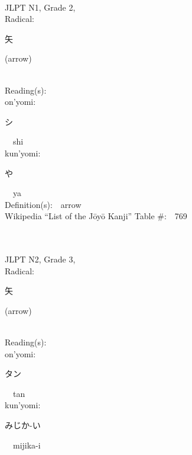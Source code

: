\begin{multicols}{2}
{\fontsize{34pt}{40pt}  }\ \ \\  %
{JLPT N1, Grade 2, \\Radical:\ \ {\begin{CJK}{UTF8}{min} 矢 \end{CJK}} (arrow) } \\
Reading(s):\ \ \\
{\hspace*{1em}}on'yomi:\ \ \\
{\hspace*{2em}}{\begin{CJK}{UTF8}{min} シ \end{CJK}}\ \ shi\ \ \\
{\hspace*{1em}}kun'yomi:\ \ \\
{\hspace*{2em}}{\begin{CJK}{UTF8}{min} や \end{CJK}}\ \ ya\ \ \\
Definition(s):\ \ arrow \\
Wikipedia ``List of the J\=oy\=o Kanji'' Table \#:\ \ 769 \\
\ \ \\
{\fontsize{34pt}{40pt}  }\ \ \\  %
{JLPT N2, Grade 3, \\Radical:\ \ {\begin{CJK}{UTF8}{min} 矢 \end{CJK}} (arrow) } \\
Reading(s):\ \ \\
{\hspace*{1em}}on'yomi:\ \ \\
{\hspace*{2em}}{\begin{CJK}{UTF8}{min} タン \end{CJK}}\ \ tan\ \ \\
{\hspace*{1em}}kun'yomi:\ \ \\
{\hspace*{2em}}{\begin{CJK}{UTF8}{min} みじか-い \end{CJK}}\ \ mijika-i\ \ \\

\end{multicols}

